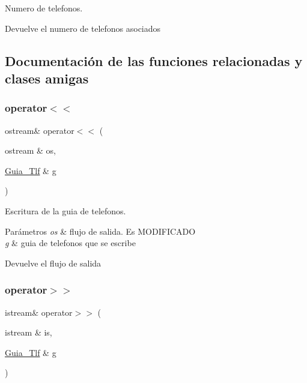 Numero de telefonos. 

\begin{DoxyReturn}{Devuelve}
el numero de telefonos asociados 
\end{DoxyReturn}


\subsection{Documentación de las funciones relacionadas y clases amigas}
\mbox{\label{classGuia__Tlf_a73eb02557f3118999710c66aa9ecf309}} 
\subsubsection{\texorpdfstring{operator$<$$<$}{operator<<}}
{\footnotesize\ttfamily ostream\& operator$<$$<$ (\begin{DoxyParamCaption}\item[{ostream \&}]{os,  }\item[{\hyperlink{classGuia__Tlf}{Guia\+\_\+\+Tlf} \&}]{g }\end{DoxyParamCaption})\hspace{0.3cm}{\ttfamily [friend]}}



Escritura de la guia de telefonos. 


\begin{DoxyParams}{Parámetros}
{\em os} & flujo de salida. Es M\+O\+D\+I\+F\+I\+C\+A\+DO \\
\hline
{\em g} & guia de telefonos que se escribe \\
\hline
\end{DoxyParams}
\begin{DoxyReturn}{Devuelve}
el flujo de salida 
\end{DoxyReturn}
\mbox{\label{classGuia__Tlf_ac15a5b0c2eb7d5b1843f11beb492495e}} 
\subsubsection{\texorpdfstring{operator$>$$>$}{operator>>}}
{\footnotesize\ttfamily istream\& operator$>$$>$ (\begin{DoxyParamCaption}\item[{istream \&}]{is,  }\item[{\hyperlink{classGuia__Tlf}{Guia\+\_\+\+Tlf} \&}]{g }\end{DoxyParamCaption})\hspace{0.3cm}{\ttfamily [friend]}}



